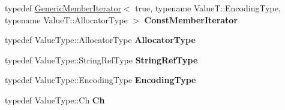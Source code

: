 \begin{DoxyCompactItemize}
\item 
typedef \hyperlink{class_generic_member_iterator}{Generic\+Member\+Iterator}$<$ true, typename Value\+T\+::\+Encoding\+Type, typename Value\+T\+::\+Allocator\+Type $>$ {\bfseries Const\+Member\+Iterator}\hypertarget{class_generic_object_af16706c0ad32b957c56e7d0541628cd5}{}\label{class_generic_object_af16706c0ad32b957c56e7d0541628cd5}

\item 
typedef Value\+Type\+::\+Allocator\+Type {\bfseries Allocator\+Type}\hypertarget{class_generic_object_a00c8cee952d5ebadc5e1c309aa489ad9}{}\label{class_generic_object_a00c8cee952d5ebadc5e1c309aa489ad9}

\item 
typedef Value\+Type\+::\+String\+Ref\+Type {\bfseries String\+Ref\+Type}\hypertarget{class_generic_object_a9b8381fc96f5f89b2163b052ed66cc59}{}\label{class_generic_object_a9b8381fc96f5f89b2163b052ed66cc59}

\item 
typedef Value\+Type\+::\+Encoding\+Type {\bfseries Encoding\+Type}\hypertarget{class_generic_object_a96ebfdde095e2ce42535d15ae5dc58ef}{}\label{class_generic_object_a96ebfdde095e2ce42535d15ae5dc58ef}

\item 
typedef Value\+Type\+::\+Ch {\bfseries Ch}\hypertarget{class_generic_object_ac6747e5baa13e15bcea1658b5624647a}{}\label{class_generic_object_ac6747e5baa13e15bcea1658b5624647a}

\end{DoxyCompactItemize}
